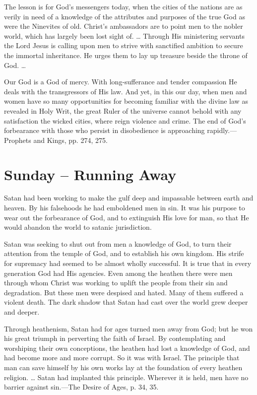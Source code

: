 \documentclass[a4paper, 10pt, twoside, headings=small]{scrartcl}
\begin{document}
\begin{multicols}{2}
The lesson is for God’s messengers today, when the cities of the nations are as verily in need of a knowledge of the attributes and purposes of the true God as were the Ninevites of old. Christ’s ambassadors are to point men to the nobler world, which has largely been lost sight of. … Through His ministering servants the Lord Jesus is calling upon men to strive with sanctified ambition to secure the immortal inheritance. He urges them to lay up treasure beside the throne of God. …

Our God is a God of mercy. With long-sufferance and tender compassion He deals with the transgressors of His law. And yet, in this our day, when men and women have so many opportunities for becoming familiar with the divine law as revealed in Holy Writ, the great Ruler of the universe cannot behold with any satisfaction the wicked cities, where reign violence and crime. The end of God’s forbearance with those who persist in disobedience is approaching rapidly.—Prophets and Kings, pp. 274, 275.

\section*{Sunday – Running Away}

Satan had been working to make the gulf deep and impassable between earth and heaven. By his falsehoods he had emboldened men in sin. It was his purpose to wear out the forbearance of God, and to extinguish His love for man, so that He would abandon the world to satanic jurisdiction.

Satan was seeking to shut out from men a knowledge of God, to turn their attention from the temple of God, and to establish his own kingdom. His strife for supremacy had seemed to be almost wholly successful. It is true that in every generation God had His agencies. Even among the heathen there were men through whom Christ was working to uplift the people from their sin and degradation. But these men were despised and hated. Many of them suffered a violent death. The dark shadow that Satan had cast over the world grew deeper and deeper.

Through heathenism, Satan had for ages turned men away from God; but he won his great triumph in perverting the faith of Israel. By contemplating and worshiping their own conceptions, the heathen had lost a knowledge of God, and had become more and more corrupt. So it was with Israel. The principle that man can save himself by his own works lay at the foundation of every heathen religion. … Satan had implanted this principle. Wherever it is held, men have no barrier against sin.—The Desire of Ages, p. 34, 35.


\end{multicols}
\end{document}
